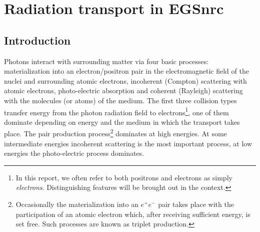 
%
%
%
%
%
%
%
%
%


\section{Radiation transport in EGSnrc}
\label{section_2}

\subsection{Introduction}


Photons interact with surrounding matter via four 
basic processes: materialization into an electron/positron pair 
in the electromagnetic field of the nuclei and surrounding 
atomic electrons, incoherent (Compton) scattering with 
atomic electrons, 
photo-electric absorption and 
coherent (Rayleigh) scattering with 
the molecules (or atoms) of the medium. The first three 
collision types transfer energy from the photon radiation 
field to electrons\footnote{In this report, we often refer to
both positrons and electrons as simply {\it electrons}.
Distinguishing features will be brought out in the context.}, 
one of them dominate depending on energy and the medium 
in which the transport takes place. The pair production 
process\footnote{Occasionally the materialization into an $e^+e^-$ pair 
takes place with the participation of an atomic electron which, after 
receiving sufficient energy, is set free. Such processes are known 
as triplet production.} dominates at high energies. 
At some intermediate energies incoherent scattering is the most 
important process, at low energies the photo-electric process 
dominates.

